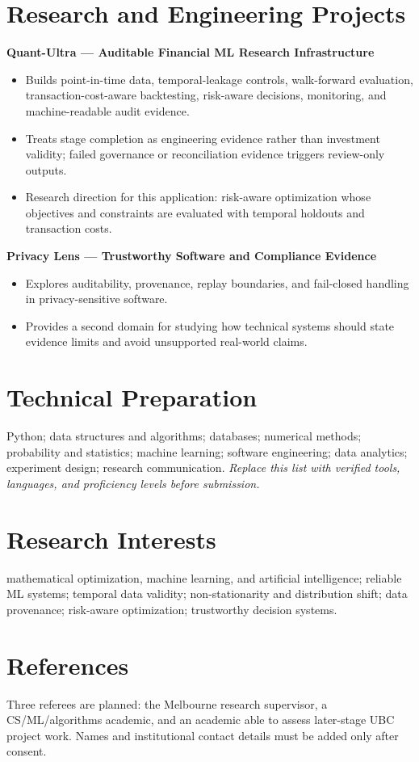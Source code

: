 \documentclass[11pt]{article}
\begin{document}
\section*{Research and Engineering Projects}
\textbf{Quant-Ultra --- Auditable Financial ML Research Infrastructure}
\begin{itemize}
\item Builds point-in-time data, temporal-leakage controls, walk-forward evaluation, transaction-cost-aware backtesting, risk-aware decisions, monitoring, and machine-readable audit evidence.
\item Treats stage completion as engineering evidence rather than investment validity; failed governance or reconciliation evidence triggers review-only outputs.
\item Research direction for this application: risk-aware optimization whose objectives and constraints are evaluated with temporal holdouts and transaction costs.
\end{itemize}

\begin{samepage}
\textbf{Privacy Lens --- Trustworthy Software and Compliance Evidence}
\begin{itemize}
\item Explores auditability, provenance, replay boundaries, and fail-closed handling in privacy-sensitive software.
\item Provides a second domain for studying how technical systems should state evidence limits and avoid unsupported real-world claims.
\end{itemize}
\end{samepage}

\section*{Technical Preparation}
Python; data structures and algorithms; databases; numerical methods; probability and statistics; machine learning; software engineering; data analytics; experiment design; research communication. \textit{Replace this list with verified tools, languages, and proficiency levels before submission.}

\section*{Research Interests}
mathematical optimization, machine learning, and artificial intelligence; reliable ML systems; temporal data validity; non-stationarity and distribution shift; data provenance; risk-aware optimization; trustworthy decision systems.

\section*{References}
Three referees are planned: the Melbourne research supervisor, a CS/ML/algorithms academic, and an academic able to assess later-stage UBC project work. Names and institutional contact details must be added only after consent.
\end{document}
